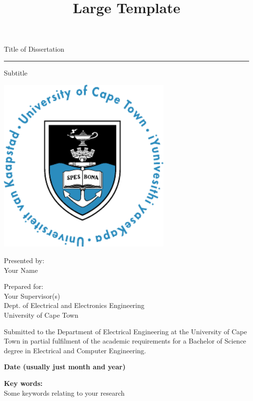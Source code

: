 \title{Large Template}

\begin{titlepage}
\begin{center}
{\Huge Title of Dissertation }
\vskip 3mm
\hrule
{\Large Subtitle}
\end{center}

\vskip 15mm
\begin{center}
\includegraphics[height=3.467in]{Figures/UCT_Circular}
\end{center}

\vfill

\vskip 5mm
\begin{center}
Presented by:\\
Your Name  %
\end{center}

\vskip 10mm
\begin{center}
Prepared for:\\
Your Supervisor(s)\\
Dept. of Electrical and Electronics Engineering\\University of Cape Town
\end{center}

\vskip 10mm
\begin{center}
Submitted to the Department of Electrical Engineering at the University of Cape Town in partial
fulfilment of the academic requirements for a Bachelor of Science degree in Electrical and Computer Engineering.
\end{center}

\vskip 5mm
\begin{center}{\bf Date (usually just month and year)}
\end{center}

\begin{center}
\textbf{Key words:}\\
Some keywords relating to your research

\end{center}

\end{titlepage}

